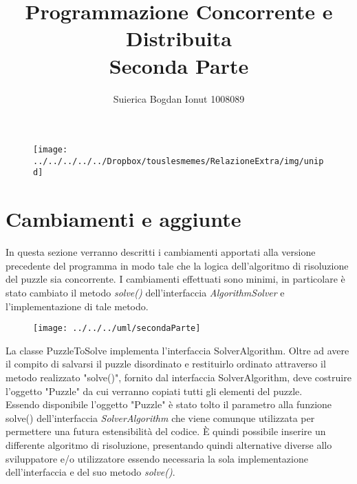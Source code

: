 \documentclass[13pt]{article}
\title{Programmazione Concorrente e Distribuita\\Seconda Parte}
\author{Suierica Bogdan Ionut 1008089}
\begin{document}
\maketitle

\begin{figure}[h]
\centering
\texttt{[image: ../../../../../Dropbox/touslesmemes/RelazioneExtra/img/unipd]}
\label{fig:unipd}
\end{figure}

\newpage
\section{Cambiamenti e aggiunte}
In questa sezione verranno descritti i cambiamenti apportati alla versione precedente del programma in modo tale che la logica dell'algoritmo di risoluzione del puzzle sia concorrente. I cambiamenti effettuati sono minimi, in particolare è stato cambiato il metodo \textit{solve()} dell'interfaccia \textit{AlgorithmSolver} e l'implementazione di tale metodo.
\begin{figure}[h]
\centering
\texttt{[image: ../../../uml/secondaParte]}
\label{fig:secondaParte}
\end{figure}

La classe PuzzleToSolve implementa l'interfaccia SolverAlgorithm. Oltre ad avere il compito di salvarsi il puzzle disordinato e restituirlo ordinato attraverso il metodo realizzato "solve()", fornito dal interfaccia SolverAlgorithm, deve costruire l'oggetto "Puzzle" da cui verranno copiati tutti gli elementi del puzzle.
\\
Essendo disponibile l'oggetto "Puzzle" è stato tolto il parametro alla funzione solve() dell'interfaccia \textit{SolverAlgorithm} che viene comunque utilizzata per permettere una futura estensibilità del codice. È quindi possibile inserire un differente algoritmo di risoluzione, presentando quindi alternative diverse allo sviluppatore e/o utilizzatore essendo necessaria la sola implementazione dell'interfaccia e del suo metodo \textit{solve()}.
\end{document}
